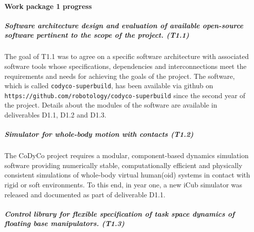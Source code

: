 

\newcommand{\EQ}{\!\!\!=\!\!\!}

\newcommand{\Bp}{\mathbf{p}}
\newcommand{\Br}{\mathbf{r}}
\newcommand{\Bf}{\mathbf{f}}
\newcommand{\BJ}{\mathbf{J}}
\newcommand{\Bv}{\mathbf{v}}
\newcommand{\BI}{\mathbf{I}}
\newcommand{\BR}{\mathbf{R}}
\newcommand{\BK}{\mathbf{K}}
\newcommand{\BD}{\mathbf{D}}
\newcommand{\BA}{\mathbf{A}}
\newcommand{\Bb}{\mathbf{b}}
\newcommand{\BM}{\mathbf{M}}
\newcommand{\BC}{\mathbf{C}}
\newcommand{\Bg}{\mathbf{g}}
\newcommand{\BS}{\mathbf{S}}
\newcommand{\Bzero}{\mathbf{0}}
\newcommand{\BN}{\mathbf{N}}
\newcommand{\Bh}{\mathbf{h}}
\newcommand{\BW}{\mathbf{W}}
\newcommand{\Bq}{\mathbf{q}}
\newcommand{\BF}{\mathbf{F}}
\newcommand{\Bn}{\mathbf{n}}

\newcommand{\Bomega}{\boldsymbol{\omega}}
\newcommand{\Btau}{\boldsymbol{\tau}}
\newcommand{\Balpha}{\boldsymbol{\alpha}}
\newcommand{\Bbeta}{\boldsymbol{\beta}}



\paragraph{Work package 1 progress}

\subparagraph{Software architecture design and evaluation of available
  open-source software pertinent to the scope of the project. (T1.1)}

The goal of T1.1 was to agree on a specific software architecture with
associated software tools whose specifications, dependencies and
interconnections meet the requirements and needs for achieving the goals of
the project.  The software, which is called \texttt{codyco-superbuild}, has
been available via github on
\texttt{https://github.com/robotology/codyco-superbuild} since the second year
of the project.  Details about the modules of the software are available in
deliverables D1.1, D1.2 and D1.3.

\subparagraph{Simulator for whole-body motion with contacts (T1.2)}

The CoDyCo project requires a modular, component-based dynamics simulation
software providing numerically stable, computationally efficient and
physically consistent simulations of whole-body virtual human(oid) systems in
contact with rigid or soft environments.  To this end, in year one, a new iCub
simulator was released and documented as part of deliverable D1.1.


\subparagraph{Control library for flexible specification of task space
  dynamics of floating base manipulators. (T1.3)}



